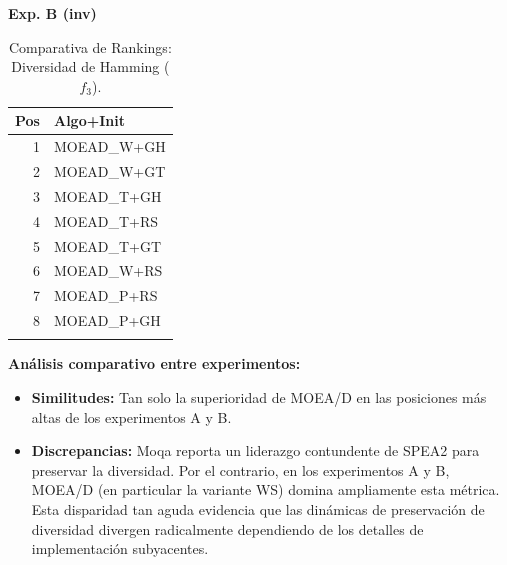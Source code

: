 \documentclass[a4paper,10pt]{article}
\begin{document}
\begin{table}[H]
\begin{minipage}[t]{0.32\textwidth}
        \centering\scriptsize\textbf{Exp. B (inv)}\\
        \begin{tabular}{rl}
            \toprule
            Pos & Algo+Init \\ \midrule
            1 & MOEAD\_W+GH \\
            2 & MOEAD\_W+GT \\
            3 & MOEAD\_T+GH \\
            4 & MOEAD\_T+RS \\
            5 & MOEAD\_T+GT \\
            6 & MOEAD\_W+RS \\
            7 & MOEAD\_P+RS \\
            8 & MOEAD\_P+GH \\
            \\
            \bottomrule
        \end{tabular}
    \end{minipage}
    \caption{Comparativa de Rankings: Diversidad de Hamming ($f_3$).}
\end{table}

\textbf{Análisis comparativo entre experimentos:}
\begin{itemize}
    \item \textbf{Similitudes:} Tan solo la superioridad de MOEA/D en las posiciones más altas de los experimentos A y B.
    \item \textbf{Discrepancias:} Moqa reporta un liderazgo contundente de SPEA2 para preservar la diversidad. Por el contrario, en los experimentos A y B, MOEA/D (en particular la variante WS) domina ampliamente esta métrica. Esta disparidad tan aguda evidencia que las dinámicas de preservación de diversidad divergen radicalmente dependiendo de los detalles de implementación subyacentes.
\end{itemize}
\end{document}
